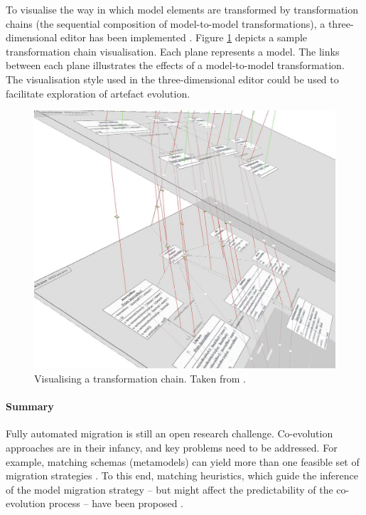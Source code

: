 To \cc visualise the way in which model elements are transformed by transformation chains (the sequential composition of model-to-model transformations), a three-dimensional editor has been implemented \cite{pilgrim08constructing}. Figure \ref{fig:transformation-chains} depicts a sample transformation chain visualisation. Each plane represents a model. The links between each plane illustrates the effects of a model-to-model transformation. The visualisation style used in the three-dimensional editor could be used to facilitate exploration of artefact evolution.


\begin{figure}[htbp]
  \begin{center}
    \leavevmode
    \includegraphics[scale=0.25]{3.LiteratureReview/images/transformation-chain.png}
  \end{center}
  \caption[Visualising a transformation chain]{Visualising a transformation chain. Taken from \cite{pilgrim08constructing}.}
  \label{fig:transformation-chains}
\end{figure}

\paragraph{Summary}
Fully automated migration is still an open research challenge. Co-evolution approaches are in their infancy, and key problems need to be addressed. For \cc example, matching schemas (metamodels) can yield more than one feasible set of migration strategies \cite{lerner00model}. To this end, matching \cc heuristics, which guide the inference of the model migration strategy -- but might affect the predictability of the co-evolution process -- have been proposed \cite{garces09managing}. 

